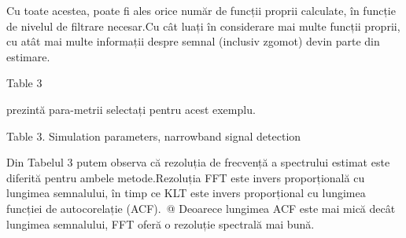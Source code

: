 \documentclass[12pt]{report}
\begin{document}
Cu toate acestea, poate fi ales orice număr de funcții proprii calculate, în funcție de nivelul de filtrare necesar.\@ Cu cât luați în considerare mai multe funcții proprii, cu atât mai multe informații despre semnal (inclusiv zgomot) devin parte din estimare.\@ \begin{normalsize}\color{red}Table 3\end{normalsize} prezintă para-metrii selectați pentru acest exemplu.\begin{center}
	\color{blue}Table 3. Simulation parameters, narrowband signal detection
\end{center}
Din Tabelul 3 putem observa că rezoluția de frecvență a spectrului estimat este diferită pentru ambele metode.\@ Rezoluția FFT este invers proporțională cu lungimea semnalului, în timp ce KLT este invers proporțional cu lungimea funcției de autocorelație (ACF).\ @ Deoarece lungimea ACF este mai mică decât lungimea semnalului, FFT oferă o rezoluție spectrală mai bună.
\end{document}
